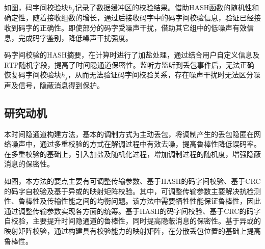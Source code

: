 如图，码字间校验块$h_{j}$记录了数据缓冲区的校验结果。借助HASH函数的随机性和确定性，随着接收组数的增长，通过后接收码字中的码字间校验信息，验证已经接收到码字的正确性。即使部分的码字受噪声干扰，借助其它组中的低噪声有效信息，完成码字鉴别，降低噪声干扰强度。

码字间校验的HASH摘要，在计算时进行了加盐处理，通过结合用户自定义信息及RTP随机字段，提高了时间隐通道保密性。监听方监听到丢包事件后，无法正确恢复码字间校验块$h_{j}$，从而无法验证码字间校验关系，存在噪声干扰时无法区分噪声及信号，隐蔽消息得到保护。

\subsection{研究动机}
\label{chap:hash:motivation:motivation}

本时间隐通道构建方法，基本的调制方式为主动丢包，将调制产生的丢包隐匿在网络噪声中，通过多重校验的方式在解调过程中有效去噪，提高鲁棒性降低误码率。在多重校验的基础上，引入加盐及随机化过程，增加调制过程的随机度，增强隐蔽消息的保密性。


如图，本方法的要点主要有可调整传输参数、基于HASH的码字间校验、基于CRC的码字自校验及基于异或的映射矩阵校验。其中，可调整传输参数主要解决抗检测性、鲁棒性及传输性能之间的均衡问题。该方法中需要牺牲性能保证鲁棒性，因此通过调整传输参数实现各方面的统筹。基于HASH的码字间校验、基于CRC的码字自校验，主要提升时间隐通道的鲁棒性，同时提高隐蔽消息的保密性。基于异或的映射矩阵校验，通过构建具有校验能力的映射矩阵，在分散丢包位置的基础上提高鲁棒性。